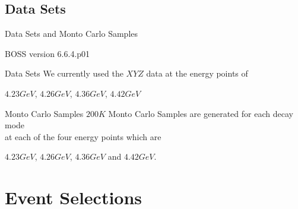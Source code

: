 \documentclass{beamer}
\begin{document}
\subsection{Data Sets}
\begin{frame}{Data Sets and Monto Carlo Samples}
  \begin{block}{BOSS version}
    6.6.4.p01
  \end{block}
  \begin{block}{Data Sets}
    We currently used the $XYZ$ data at the energy points of\\
    \begin{center}
      $4.23 GeV$, $4.26 GeV$, $4.36 GeV$, $4.42 GeV$\\
    \end{center}
  \end{block}
  \begin{block}{Monto Carlo Samples}
    $200 K$ Monto Carlo Samples are generated for each decay mode\\ at each of the four energy points which are\\
    \begin{center}
      $4.23 GeV$, $4.26 GeV$, $4.36 GeV$ and $4.42 GeV$.
    \end{center}
  \end{block}
\end{frame}
\section{Event Selections}
\end{document}
